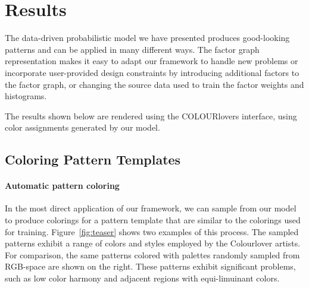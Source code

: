 \section{Results}
\label{sec:results}

The data-driven probabilistic model we have presented produces good-looking patterns and can be applied in many different ways. The factor graph representation makes it easy to adapt our framework to handle new problems or incorporate user-provided design constraints by introducing additional factors to the factor graph, or changing the source data used to train the factor weights and histograms.


The results shown below are rendered using the COLOURlovers interface, using color assignments generated by our model. 

\subsection{Coloring Pattern Templates}

\paragraph{Automatic pattern coloring} In the most direct application of our framework, we can sample from our model to produce colorings for a pattern template that are similar to the colorings used for training. Figure~\ref{fig:teaser} shows two examples of this process. The sampled patterns exhibit a range of colors and styles employed by the Colourlover artists. For comparison, the same patterns colored with palettes randomly sampled from RGB-space are shown on the right. These patterns exhibit significant problems, such as low color harmony and adjacent regions with equi-limuinant colors.

